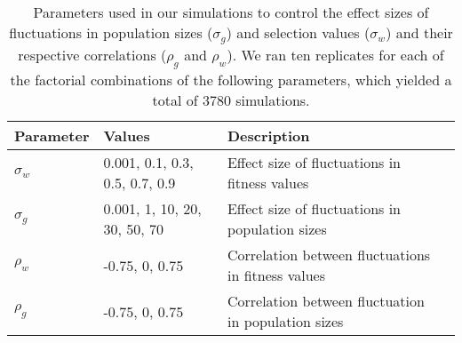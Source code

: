 \documentclass[12pt]{article}
\begin{document}
\begin{table}[h]
\fontsize{10}{18}\selectfont
\centering
\caption{Parameters used in our simulations to control the effect sizes of fluctuations in population sizes ($\sigma_{g}$) and selection values ($\sigma_{w}$) and their respective correlations ($\rho_{g}$ and $\rho_{w}$). We ran ten replicates for each of the factorial combinations of the following parameters, which yielded a total of 3780 simulations. }
\begin{tabular}{@{}llll@{}}
\toprule
Parameter                    & Values                    & Description                                   &  \\ \midrule
$\sigma_{w}$ & 0.001, 0.1, 0.3, 0.5, 0.7, 0.9 & Effect size of fluctuations in fitness values &  \\
$\sigma_{g}$ & 0.001, 1, 10, 20, 30, 50, 70 & Effect size of fluctuations in population sizes                                              &  \\
$\rho_{w}$  &  -0.75, 0, 0.75                         &   Correlation between fluctuations in fitness values                                            &  \\
$\rho_{g}$  &   -0.75, 0, 0.75                        &  Correlation between fluctuation in population sizes                                             &  \\ \bottomrule
\end{tabular}
\label{tab:fluctuations}
\end{table}




\clearpage


\end{document}
